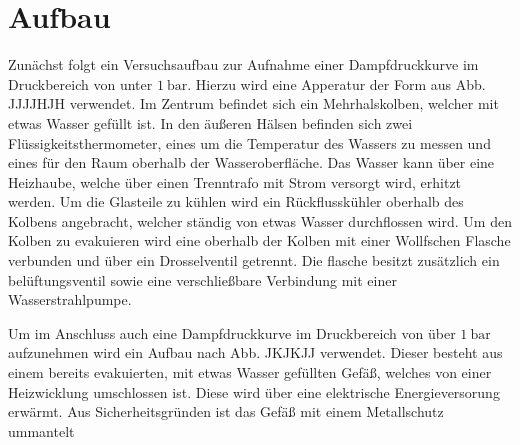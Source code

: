 \section{Aufbau}
Zunächst folgt ein Versuchsaufbau zur Aufnahme einer Dampfdruckkurve im Druckbereich
 von unter $\SI{1}{\bar}$. Hierzu wird eine Apperatur der Form aus Abb. JJJJHJH verwendet.
   Im Zentrum befindet sich ein Mehrhalskolben, welcher mit etwas Wasser gefüllt ist.
    In den äußeren Hälsen befinden sich zwei Flüssigkeitsthermometer, eines um die
     Temperatur des Wassers zu messen und eines für den Raum oberhalb der
      Wasseroberfläche. Das Wasser kann über eine Heizhaube, welche über einen
       Trenntrafo mit Strom versorgt wird, erhitzt werden. Um die Glasteile
        zu kühlen wird ein Rückflusskühler oberhalb des Kolbens angebracht, welcher
         ständig von etwas Wasser durchflossen wird. Um den Kolben zu
          evakuieren wird eine oberhalb der Kolben mit einer Wollfschen Flasche
           verbunden und über ein Drosselventil getrennt. Die flasche besitzt
           zusätzlich ein belüftungsventil sowie eine verschließbare Verbindung
            mit einer Wasserstrahlpumpe.

            Um im Anschluss auch eine Dampfdruckkurve im Druckbereich von über
             $\SI{1}{\bar}$ aufzunehmen wird ein Aufbau nach Abb. JKJKJJ verwendet.
              Dieser besteht aus einem bereits evakuierten, mit etwas Wasser
               gefüllten Gefäß, welches von einer Heizwicklung umschlossen ist.
                Diese wird über eine elektrische Energieversorung erwärmt. Aus
                 Sicherheitsgründen ist das Gefäß mit einem Metallschutz ummantelt
